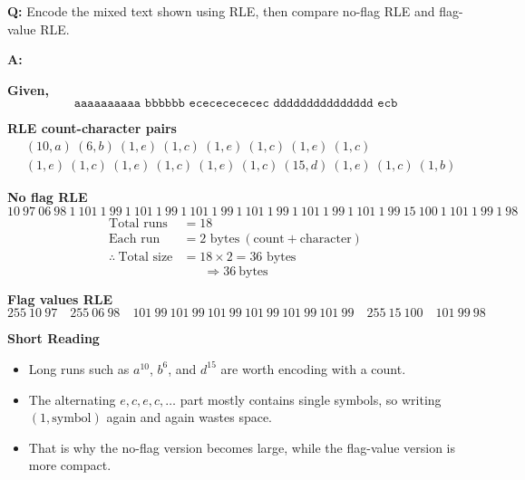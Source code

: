 \documentclass[11pt,a4paper]{book}
\newcounter{qna}[chapter]
\renewcommand{\theqna}{\thechapter.\arabic{qna}}
\newenvironment{questionanswerbox}[1][Example]{%
    \refstepcounter{qna}
    \begin{tcolorbox}[
        enhanced,
        breakable,
        colback=softlavender!10,
        colframe=softlavender!200,
        title={#1~\theqna},
        fonttitle=\bfseries,
        coltitle=white,
        colbacktitle=softlavender!200,
        sharp corners,
        boxrule=1pt,
        left=8pt,
        right=8pt,
        top=6pt,
        bottom=6pt
    ]
}{\end{tcolorbox}}
\begin{document}
\begin{questionanswerbox}[Run Length Encoding for Mixed Data Example]
\textbf{Q:} Encode the mixed text shown using RLE, then compare no-flag RLE and flag-value RLE.

\textbf{A:}

\textbf{Given,}
\[
\texttt{aaaaaaaaaa\ bbbbbb\ ecececececec\ ddddddddddddddd\ ecb}
\]

\textbf{RLE count-character pairs}
\begin{align*}
&(10,a)\ (6,b)\ (1,e)\ (1,c)\ (1,e)\ (1,c)\ (1,e)\ (1,c)\\
&(1,e)\ (1,c)\ (1,e)\ (1,c)\ (1,e)\ (1,c)\ (15,d)\ (1,e)\ (1,c)\ (1,b)
\end{align*}

\textbf{No flag RLE}
\[
10\ 97\ 06\ 98\ 1\ 101\ 1\ 99\ 1\ 101\ 1\ 99\ 1\ 101\ 1\ 99\ 1\ 101\ 1\ 99\ 1\ 101\ 1\ 99\ 1\ 101\ 1\ 99\ 15\ 100\ 1\ 101\ 1\ 99\ 1\ 98
\]
\begin{align*}
\text{Total runs} &= 18\\
\text{Each run} &= 2\text{ bytes}\ (\text{count} + \text{character})\\
\therefore\ \text{Total size} &= 18 \times 2 = 36\text{ bytes}
\end{align*}
\[
\Rightarrow 36\ \text{bytes}
\]

\textbf{Flag values RLE}
\[
255\ 10\ 97\quad 255\ 06\ 98\quad 101\ 99\ 101\ 99\ 101\ 99\ 101\ 99\ 101\ 99\ 101\ 99\quad 255\ 15\ 100\quad 101\ 99\ 98
\]

\textbf{Short Reading}
\begin{itemize}
    \item Long runs such as \(a^{10}\), \(b^6\), and \(d^{15}\) are worth encoding with a count.
    \item The alternating \(e,c,e,c,\ldots\) part mostly contains single symbols, so writing \((1,\text{symbol})\) again and again wastes space.
    \item That is why the no-flag version becomes large, while the flag-value version is more compact.
\end{itemize}
\end{questionanswerbox}
\end{document}
